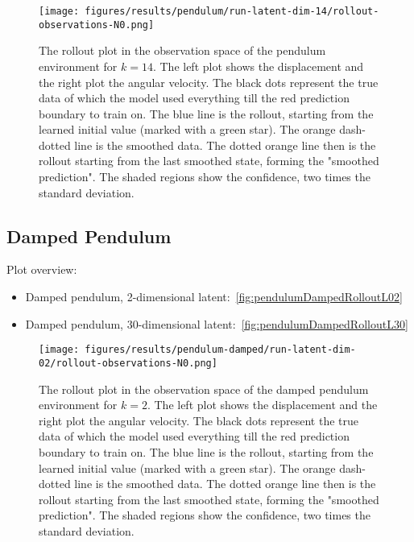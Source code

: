 		\begin{figure}
			\centering
			\texttt{[image: figures/results/pendulum/run-latent-dim-14/rollout-observations-N0.png]}
			\caption[Rollout of the pendulum experiment for 14 latent dimensions]{The rollout plot in the observation space of the pendulum environment for \(k = 14\). The left plot shows the displacement and the right plot the angular velocity. The black dots represent the true data of which the model used everything till the red prediction boundary to train on. The blue line is the rollout, starting from the learned initial value (marked with a green star). The orange dash-dotted line is the smoothed data. The dotted orange line then is the rollout starting from the last smoothed state, forming the "smoothed prediction". The shaded regions show the confidence, \ie two times the standard deviation.}
			\label{fig:pendulumRolloutL14}
		\end{figure}

	\subsection{Damped Pendulum}
		Plot overview:
		\begin{itemize}
			\item Damped pendulum, 2-dimensional latent:~\autoref{fig:pendulumDampedRolloutL02}
			\item Damped pendulum, 30-dimensional latent:~\autoref{fig:pendulumDampedRolloutL30}
		\end{itemize}

		\begin{figure}
			\centering
			\texttt{[image: figures/results/pendulum-damped/run-latent-dim-02/rollout-observations-N0.png]}
			\caption[Rollout of the damped pendulum experiment for 2 latent dimensions]{The rollout plot in the observation space of the damped pendulum environment for \(k = 2\). The left plot shows the displacement and the right plot the angular velocity. The black dots represent the true data of which the model used everything till the red prediction boundary to train on. The blue line is the rollout, starting from the learned initial value (marked with a green star). The orange dash-dotted line is the smoothed data. The dotted orange line then is the rollout starting from the last smoothed state, forming the "smoothed prediction". The shaded regions show the confidence, \ie two times the standard deviation.}
			\label{fig:pendulumDampedRolloutL02}
		\end{figure}

